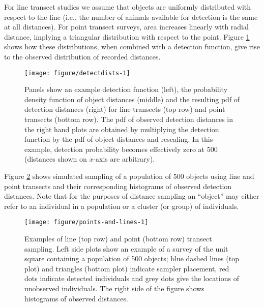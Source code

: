 \documentclass[article]{jss}\usepackage[]{graphicx}\usepackage[]{color}
\makeatletter
\def\maxwidth{ %
  \ifdim\Gin@nat@width>\linewidth
    \linewidth
  \else
    \Gin@nat@width
  \fi
}
\makeatother
\begin{document}
For line transect studies we assume that objects are uniformly distributed with respect to the line (i.e., the number of animals available for detection is the same at all distances). For point transect surveys, area increases linearly with radial distance, implying a triangular distribution with respect to the point. Figure \ref{fig:detectiondist} shows how these distributions, when combined with a detection function, give rise to the observed distribution of recorded distances.

\begin{figure}
\begin{center}
\begin{Schunk}

\texttt{[image: figure/detectdists-1]} \end{Schunk}
\caption{Panels show an example detection function (left), the probability density function of object distances (middle) and the resulting pdf of detection distances (right) for line transects (top row) and point transects (bottom row). The pdf of observed detection distances in the right hand plots are obtained by multiplying the detection function by the pdf of object distances and rescaling. In this example, detection probability becomes effectively zero at 500 (distances shown on $x$-axis are arbitrary).}
\label{fig:detectiondist}
\end{center}
\end{figure}

Figure \ref{fig:pointslines} shows simulated sampling of a population of 500 objects using line and point transects and their corresponding histograms of observed detection distances. Note that for the purposes of distance sampling an ``object'' may either refer to an individual in a population or a cluster (or group) of individuals.

\begin{figure}
\begin{center}
\begin{Schunk}

\texttt{[image: figure/points-and-lines-1]} \end{Schunk}
\caption{Examples of line (top row) and point (bottom row) transect sampling. Left side plots show an example of a survey of the unit square containing a population of 500 objects; blue dashed lines (top plot) and triangles (bottom plot) indicate sampler placement, red dots indicate detected individuals and grey dots give the locations of unobserved individuals. The right side of the figure shows histograms of observed distances.}
\label{fig:pointslines}
\end{center}
\end{figure}
\end{document}
